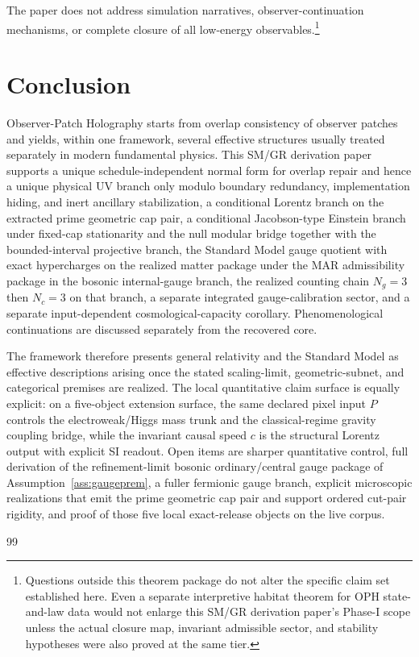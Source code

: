\documentclass[11pt]{article}
\begin{document}
The paper does not address simulation narratives, observer-continuation mechanisms, or complete closure of all low-energy observables.\footnote{Questions outside this theorem package do not alter the specific claim set established here. Even a separate interpretive habitat theorem for OPH state-and-law data would not enlarge this SM/GR derivation paper's Phase-I scope unless the actual closure map, invariant admissible sector, and stability hypotheses were also proved at the same tier.}
\section{Conclusion}

Observer-Patch Holography starts from overlap consistency of observer patches and yields, within one framework, several effective structures usually treated separately in modern fundamental physics. This SM/GR derivation paper supports a unique schedule-independent normal form for overlap repair and hence a unique physical UV branch only modulo boundary redundancy, implementation hiding, and inert ancillary stabilization, a conditional Lorentz branch on the extracted prime geometric cap pair, a conditional Jacobson-type Einstein branch under fixed-cap stationarity and the null modular bridge together with the bounded-interval projective branch, the Standard Model gauge quotient with exact hypercharges on the realized matter package under the MAR admissibility package in the bosonic internal-gauge branch, the realized counting chain \(N_g=3\) then \(N_c=3\) on that branch, a separate integrated gauge-calibration sector, and a separate input-dependent cosmological-capacity corollary. Phenomenological continuations are discussed separately from the recovered core.

The framework therefore presents general relativity and the Standard Model as effective descriptions arising once the stated scaling-limit, geometric-subnet, and categorical premises are realized. The local quantitative claim surface is equally explicit: on a five-object extension surface, the same declared pixel input \(P\) controls the electroweak/Higgs mass trunk and the classical-regime gravity coupling bridge, while the invariant causal speed \(c\) is the structural Lorentz output with explicit SI readout. Open items are sharper quantitative control, full derivation of the refinement-limit bosonic ordinary/central gauge package of Assumption~\ref{ass:gaugeprem}, a fuller fermionic gauge branch, explicit microscopic realizations that emit the prime geometric cap pair and support ordered cut-pair rigidity, and proof of those five local exact-release objects on the live corpus.

\appendix


\begin{thebibliography}{99}

\end{thebibliography}
\end{document}
